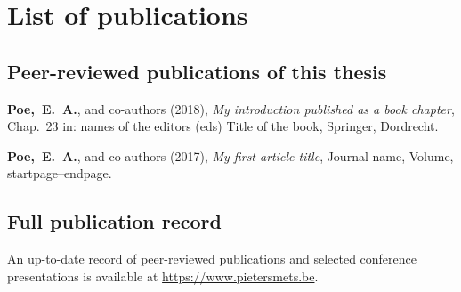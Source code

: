 
\section*{List of publications}

\subsection*{Peer-reviewed publications of this thesis}
\begin{etaremune}{
%
	\item \textbf{Poe,~E.~A.}, and co-authors (2018), \textit{My introduction published as a book chapter}, Chap.~23 in: names of the editors (eds) Title of the book, Springer, Dordrecht.{\hfill {}}
	\item \textbf{Poe,~E.~A.}, and co-authors (2017), \textit{My first article title}, Journal name, Volume, startpage--endpage. {\hfill {}}
%
}\end{etaremune}

\noindent \publicationNote

\subsection*{Full publication record}
An up-to-date record of peer-reviewed publications and selected conference presentations is available at \url{https://www.pietersmets.be}.